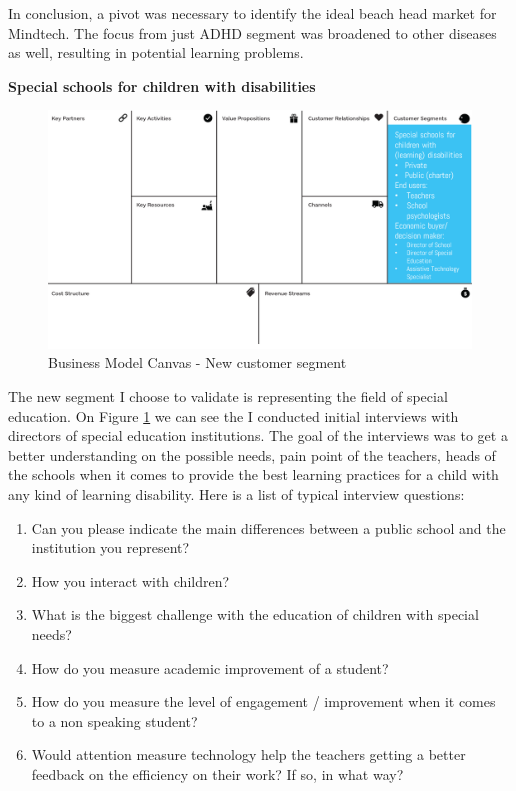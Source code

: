\documentclass[letterpaper,10pt]{article}
\begin{document}
In conclusion, a pivot was necessary to identify the ideal beach head market for Mindtech. The focus from just ADHD segment was broadened to other diseases as well, resulting in potential learning problems.

\textbf{Special schools for children with disabilities} \\

\begin{figure}[!htb]
\centering
\includegraphics[scale=0.5]{custnew.PNG}
\caption{Business Model Canvas - New customer segment}
\label{img:BMC_newcs}
\end{figure}


The new segment I choose to validate is representing the field of special education. On Figure \ref{img:BMC_newcs} we can see the  I conducted initial interviews with directors of special education institutions. The goal of the interviews was to get a better understanding on the possible needs, pain point of the teachers, heads of the schools when it comes to provide the best learning practices for a child with any kind of learning disability. Here is a list of typical interview questions:

\begin{enumerate}
  \item Can you please indicate the main differences between a public school and the institution you represent?
  \item How you interact with children?
  \item What is the biggest challenge with the education of children with special needs?
  \item How do you measure academic improvement of a student?
  \item How do you measure the level of engagement / improvement when it comes to a non speaking student?
  \item Would attention measure technology help the teachers getting a better feedback on the efficiency on their work? If so, in what way?
\end{enumerate}
\end{document}
